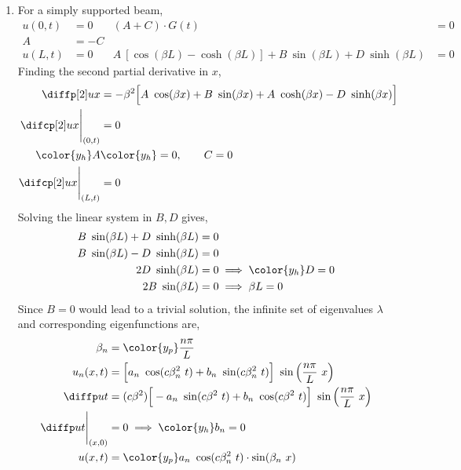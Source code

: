 \begin{enumerate}
    \item For a simply supported beam,
          \begin{align}
              u(0, t)            & = 0  &
              (A + C) \cdot G(t) & = 0    \\
              A                  & = -C   \\
              u(L, t)            & = 0  &
              A\ [\cos(\beta L) - \cosh(\beta L)] + B\ \sin(\beta L) + D\ \sinh(\beta L)
                                 & = 0
          \end{align}
          Finding the second partial derivative in $ x $,
          \begin{align}
              \diffp[2] ux                 & = -\beta^2 \Big[ A\ \cos(\beta x)
              + B\ \sin(\beta x) + A\ \cosh(\beta x) - D\ \sinh(\beta x) \Big] \\
              \difcp[2] ux \Bigg|_{(0, t)} & = 0                               \\
              \color{y_h} A                & \color{y_h} = 0, \qquad C = 0     \\
              \difcp[2] ux \Bigg|_{(L, t)} & = 0
          \end{align}
          Solving the linear system in $ B, D $ gives,
          \begin{align}
              B\ \sin(\beta L) + D\ \sinh(\beta L) & = 0                            \\
              B\ \sin(\beta L) - D\ \sinh(\beta L) & = 0                            \\
              2D\ \sinh(\beta L)                   & = 0 \implies \color{y_h} D = 0 \\
              2B\ \sin(\beta L)                    & = 0 \implies \beta L = 0
          \end{align}
          Since $ B = 0 $ would lead to a trivial solution, the infinite set of
          eigenvalues $ \lambda $ and corresponding eigenfunctions are,
          \begin{align}
              \beta_n                  & = \color{y_p}\frac{n\pi}{L}                \\
              u_n(x, t)                & = \Big[a_n\ \cos(c\beta_n^2\ t)
                  + b_n\ \sin(c\beta_n^2\ t)\Big]\ \sin\left( \frac{n\pi}{L}
              \ x \right)                                                           \\
              \diffp ut                & = (c\beta^2) \Big[ -a_n\ \sin(c\beta^2\ t)
                  + b_n\ \cos(c\beta^2\ t) \Big]\ \sin\left( \frac{n\pi}{L}
              \ x \right)                                                           \\
              \diffp ut\Bigg|_{(x, 0)} & = 0 \implies \color{y_h} b_n = 0           \\
              u(x, t)                  & = \color{y_p} a_n\ \cos(c\beta_n^2\ t)
              \cdot \sin(\beta_n\ x)
          \end{align}


\end{enumerate}
